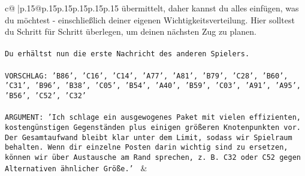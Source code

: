 \documentclass{article}
\begin{document}
{\begin{supertabular}{c@{$\;$}|p{.15\linewidth}@{}p{.15\linewidth}p{.15\linewidth}p{.15\linewidth}p{.15\linewidth}p{.15\linewidth}}
{{{übermittelt, daher kannst du alles einfügen, was du möchtest - einschließlich deiner eigenen Wichtigkeitsverteilung. Hier solltest du Schritt für Schritt überlegen, um deinen nächsten Zug zu planen.\\ \tt \\ \tt Du erhältst nun die erste Nachricht des anderen Spielers.\\ \tt \\ \tt VORSCHLAG: {'B86', 'C16', 'C14', 'A77', 'A81', 'B79', 'C28', 'B60', 'C31', 'B96', 'B38', 'C05', 'B54', 'A40', 'B59', 'C03', 'A91', 'A95', 'B56', 'C52', 'C32'}\\ \tt \\ \tt ARGUMENT: {'Ich schlage ein ausgewogenes Paket mit vielen effizienten, kostengünstigen Gegenständen plus einigen größeren Knotenpunkten vor. Der Gesamtaufwand bleibt klar unter dem Limit, sodass wir Spielraum behalten. Wenn dir einzelne Posten darin wichtig sind zu ersetzen, können wir über Austausche am Rand sprechen, z. B. C32 oder C52 gegen Alternativen ähnlicher Größe.'} 
	  } 
	   } 
	   } 
	 & \\ 
 

    \theutterance {}  


\end{supertabular}}
\end{document}
